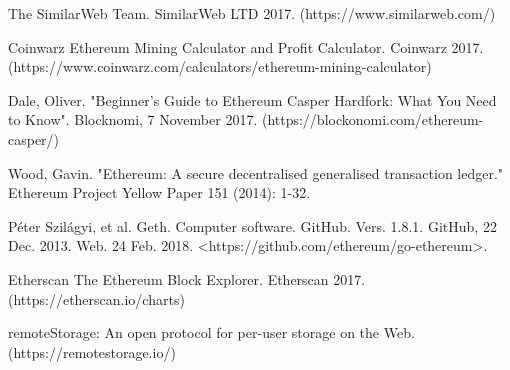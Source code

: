 \documentclass[runningheads]{llncs}
\begin{document}
\begin{thebibliography}{1}
 The SimilarWeb Team. SimilarWeb LTD 2017. (https://www.similarweb.com/)

Coinwarz Ethereum Mining Calculator and Profit Calculator. Coinwarz 2017. (https://www.coinwarz.com/calculators/ethereum-mining-calculator)

Dale, Oliver. "Beginner's Guide to Ethereum Casper Hardfork: What You Need to Know". Blocknomi, 7 November 2017. (https://blockonomi.com/ethereum-casper/)

Wood, Gavin. "Ethereum: A secure decentralised generalised transaction ledger." Ethereum Project Yellow Paper 151 (2014): 1-32.

Péter Szilágyi, et al. Geth. Computer software. GitHub. Vers. 1.8.1. GitHub, 22 Dec. 2013. Web. 24 Feb. 2018. <https://github.com/ethereum/go-ethereum>. 

Etherscan The Ethereum Block Explorer. Etherscan 2017. (https://etherscan.io/charts)

 remoteStorage: An open protocol for per-user storage on the Web. (https://remotestorage.io/)
\end{thebibliography}

\addtolength{\textheight}{-7cm}
\balance


\end{document}
